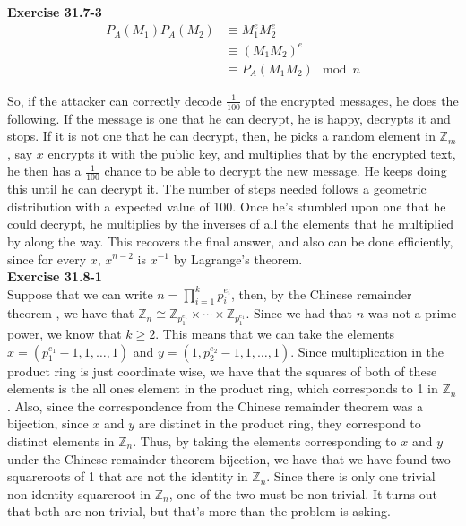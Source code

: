 \documentclass{article}
\newcommand{\Z}{\mathbb{Z}}
\begin{document}
\noindent\textbf{Exercise 31.7-3}\\

\begin{align*}
P_A(M_1)P_A(M_2) &\equiv M_1^e M_2^e\\
&\equiv (M_1 M_2)^e \\
&\equiv P_A(M_1M_2) \mod n
\end{align*}

So, if the attacker can correctly decode $\frac{1}{100}$ of the encrypted messages, he does the following. If the message is one that he can decrypt, he is happy, decrypts it and stops. If it is not one that he can decrypt, then, he picks a random element in $\Z_m$, say $x$ encrypts it with the public key, and multiplies that by the encrypted text, he then has a $\frac{1}{100}$ chance to be able to decrypt the new message. He keeps doing this until he can decrypt it. The number of steps needed follows a geometric distribution with a expected value of 100. Once he's stumbled upon one that he could decrypt, he multiplies by the inverses of all the elements that he multiplied by along the way. This recovers the final answer, and also can be done efficiently, since for every $x$, $x^{n-2}$ is $x^{-1}$ by Lagrange's theorem.\\ 



\noindent\textbf{Exercise 31.8-1}\\
Suppose that we can write $n = \prod_{i=1}^k p_i^{e_i}$, then, by the Chinese remainder theorem , we have that $\Z_n \cong \Z_{p_1^{e_1}} \times \cdots \times \Z_{p_1^{e_1}}$. Since we had that $n$ was not a prime power, we know that $k\ge 2$. This means that we can take the elements $x = (p_1^{e_1} -1, 1, \ldots ,1)$ and $y =(1,p_2^{e_2} -1,1,\ldots ,1)$. Since multiplication in the product ring is just coordinate wise, we have that the squares of both of these elements is the all ones element in the product ring, which corresponds to 1 in $\Z_n$. Also, since the correspondence from the Chinese remainder theorem was a bijection, since $x$ and $y$ are distinct in the product ring, they correspond to distinct elements in $\Z_n$. Thus, by taking the elements corresponding to $x$ and $y$ under the Chinese remainder theorem bijection, we have that we have found two squareroots of 1 that are not the identity in $\Z_n$. Since there is only one trivial non-identity squareroot in $\Z_n$, one of the two must be non-trivial. It turns out that both are non-trivial, but that's more than the problem is asking.\\
\end{document}
